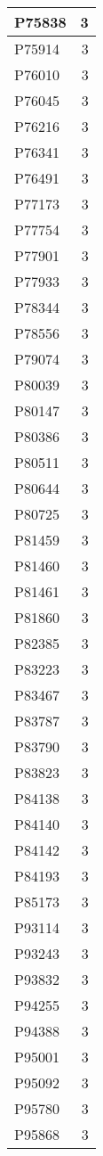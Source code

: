 \documentclass[
]{book}
\theoremstyle{definition}
\theoremstyle{definition}
\theoremstyle{definition}
\theoremstyle{definition}
\theoremstyle{remark}
\begin{document}
\begin{table}
\begin{tabular}{l|r}
\hline
P75838 & 3\\
\hline
P75914 & 3\\
\hline
P76010 & 3\\
\hline
P76045 & 3\\
\hline
P76216 & 3\\
\hline
P76341 & 3\\
\hline
P76491 & 3\\
\hline
P77173 & 3\\
\hline
P77754 & 3\\
\hline
P77901 & 3\\
\hline
P77933 & 3\\
\hline
P78344 & 3\\
\hline
P78556 & 3\\
\hline
P79074 & 3\\
\hline
P80039 & 3\\
\hline
P80147 & 3\\
\hline
P80386 & 3\\
\hline
P80511 & 3\\
\hline
P80644 & 3\\
\hline
P80725 & 3\\
\hline
P81459 & 3\\
\hline
P81460 & 3\\
\hline
P81461 & 3\\
\hline
P81860 & 3\\
\hline
P82385 & 3\\
\hline
P83223 & 3\\
\hline
P83467 & 3\\
\hline
P83787 & 3\\
\hline
P83790 & 3\\
\hline
P83823 & 3\\
\hline
P84138 & 3\\
\hline
P84140 & 3\\
\hline
P84142 & 3\\
\hline
P84193 & 3\\
\hline
P85173 & 3\\
\hline
P93114 & 3\\
\hline
P93243 & 3\\
\hline
P93832 & 3\\
\hline
P94255 & 3\\
\hline
P94388 & 3\\
\hline
P95001 & 3\\
\hline
P95092 & 3\\
\hline
P95780 & 3\\
\hline
P95868 & 3\\

\end{tabular}
\end{table}
\end{document}
